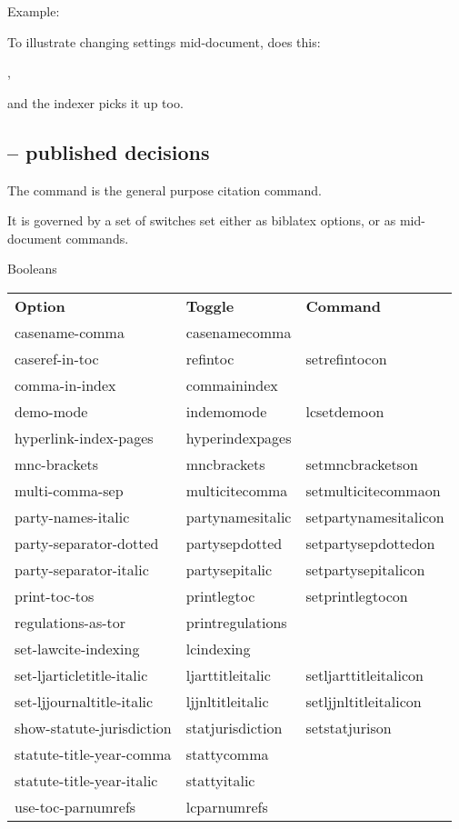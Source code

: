 \p Example:

\bigskip

\setpartysepitalicoff
\p To illustrate changing settings mid-document,
 does this: 

, 

and the indexer picks it up too.

\subsection{ -- published decisions}

\p The  command is the general purpose citation command.

\p It is governed by a set of switches set either as biblatex options, or as mid-document commands.
\bigskip

\newpage
\p Booleans

\begin{tabular}{lll}
\bfseries Option & \bfseries Toggle & \bfseries Command \\ 
casename-comma & casenamecomma &  \\ 
caseref-in-toc & refintoc & setrefintocon \\ 
comma-in-index & commainindex &  \\ 
demo-mode & indemomode & lcsetdemoon \\ 
hyperlink-index-pages & hyperindexpages &  \\ 
mnc-brackets & mncbrackets & setmncbracketson \\ 
multi-comma-sep & multicitecomma & setmulticitecommaon \\ 
party-names-italic & partynamesitalic & setpartynamesitalicon \\ 
party-separator-dotted & partysepdotted & setpartysepdottedon \\ 
party-separator-italic & partysepitalic & setpartysepitalicon \\ 
print-toc-tos & printlegtoc & setprintlegtocon \\ 
regulations-as-tor & printregulations &  \\ 
set-lawcite-indexing & lcindexing &  \\ 
set-ljarticletitle-italic & ljarttitleitalic & setljarttitleitalicon \\ 
set-ljjournaltitle-italic & ljjnltitleitalic & setljjnltitleitalicon \\ 
show-statute-jurisdiction & statjurisdiction & setstatjurison \\ 
statute-title-year-comma & stattycomma &  \\ 
statute-title-year-italic & stattyitalic &  \\ 
use-toc-parnumrefs & lcparnumrefs &  \\ 
\end{tabular}

